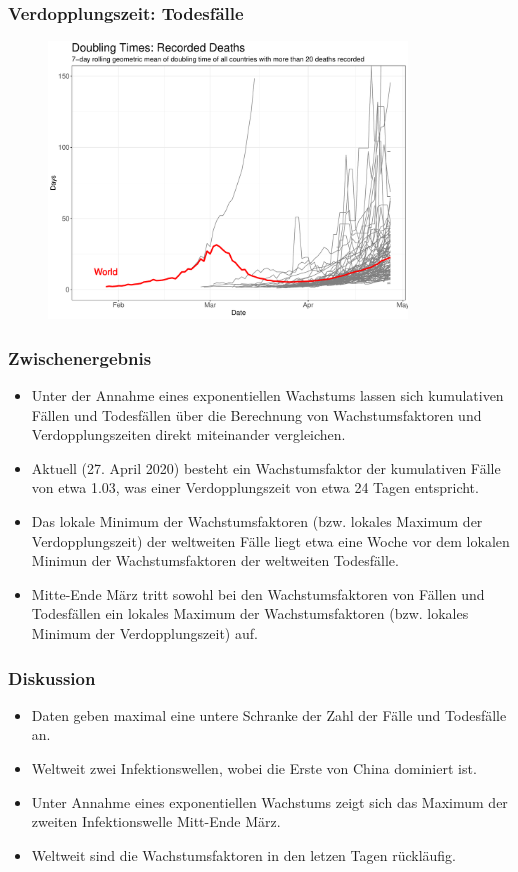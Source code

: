 \documentclass{beamer}
\begin{document}
\begin{frame}
	\frametitle{Verdopplungszeit: Todesfälle}
	\begin{figure}
		\centering
		\includegraphics[width = 270pt]{DT_deaths}
	\end{figure}
\end{frame}

 \begin{frame}
 	\frametitle{Zwischenergebnis}
 	\begin{itemize}
 		\item Unter der Annahme eines exponentiellen Wachstums lassen sich kumulativen Fällen und Todesfällen über die Berechnung von Wachstumsfaktoren und Verdopplungszeiten direkt miteinander vergleichen. 
 		\item Aktuell (27. April 2020) besteht ein Wachstumsfaktor der kumulativen Fälle von etwa 1.03, was einer Verdopplungszeit von etwa 24 Tagen entspricht.
 		\item Das lokale Minimum der Wachstumsfaktoren (bzw. lokales Maximum der Verdopplungszeit) der weltweiten Fälle liegt etwa eine Woche vor dem lokalen Minimun der Wachstumsfaktoren der weltweiten Todesfälle.
 		\item Mitte-Ende März tritt sowohl bei den Wachstumsfaktoren von Fällen und Todesfällen ein lokales Maximum der Wachstumsfaktoren (bzw. lokales Minimum der Verdopplungszeit) auf.
 	\end{itemize}
 \end{frame}

\begin{frame}
	\frametitle{Diskussion}
	\begin{itemize}
		\item Daten geben maximal eine untere Schranke der Zahl der Fälle und Todesfälle an.
		\item Weltweit zwei Infektionswellen, wobei die Erste von China dominiert ist.
		\item Unter Annahme eines exponentiellen Wachstums zeigt sich das Maximum der zweiten Infektionswelle Mitt-Ende März.
		\item Weltweit sind die Wachstumsfaktoren in den letzen Tagen rückläufig.
	\end{itemize}
\end{frame}
\end{document}
